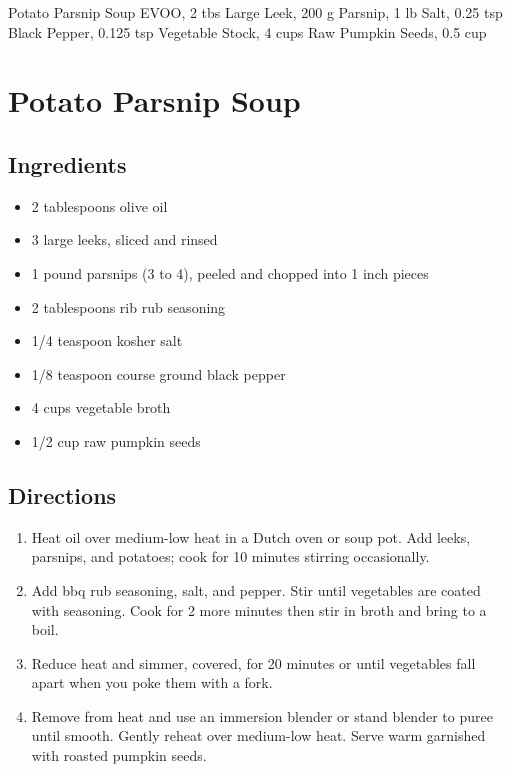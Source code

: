 Potato Parsnip Soup
  EVOO, 2 tbs
  Large Leek, 200 g
  Parsnip, 1 lb
  Salt, 0.25 tsp
  Black Pepper, 0.125 tsp
  Vegetable Stock, 4 cups
  Raw Pumpkin Seeds, 0.5 cup

\section{ Potato Parsnip Soup }

\subsection{ Ingredients }

\begin{itemize}
  \item 2 tablespoons olive oil
  \item 3 large leeks, sliced and rinsed
  \item 1 pound parsnips (3 to 4), peeled and chopped into 1 inch pieces
  \item 2 tablespoons rib rub seasoning
  \item 1/4 teaspoon kosher salt
  \item 1/8 teaspoon course ground black pepper
  \item 4 cups vegetable broth
  \item 1/2 cup raw pumpkin seeds
\end{itemize}

\subsection{ Directions }

\begin{enumerate}
  \item Heat oil over medium-low heat in a Dutch oven or soup pot. Add leeks, parsnips, and potatoes; cook for 10 minutes stirring occasionally. 
  \item Add bbq rub seasoning, salt, and pepper. Stir until vegetables are coated with seasoning. Cook for 2 more minutes then stir in broth and bring to a boil. 
  \item Reduce heat and simmer, covered, for 20 minutes or until vegetables fall apart when you poke them with a fork. 
  \item Remove from heat and use an immersion blender or stand blender to puree until smooth. Gently reheat over medium-low heat. Serve warm garnished with roasted pumpkin seeds. 
\end{enumerate}
